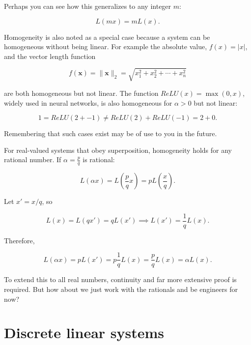\documentclass[
  letterpaper,
]{book}
\begin{document}
Perhaps you can see how this generalizes to any integer \(m\):

\[
L(m x) = m L(x).
\]

Homogeneity is also noted as a special case because a system can be
homogeneous without being linear. For example the absolute value,
\(f(x) = |x|\), and the vector length function

\[
f(\mathbf{x}) = \|\mathbf{x}\|_2 = \sqrt{x_1^2 + x_2^2 + \cdots + x_n^2}
\]

are both homogeneous but not linear. The function
\(ReLU(x) = \max(0, x)\), widely used in neural networks, is also
homogeneous for \(\alpha > 0\) but not linear:

\[
1 = ReLU(2 + -1) \neq ReLU(2) + ReLU(-1) = 2 + 0.
\]

Remembering that such cases exist may be of use to you in the future.

\begin{tcolorbox}[enhanced jigsaw, colframe=quarto-callout-note-color-frame, titlerule=0mm, rightrule=.15mm, opacitybacktitle=0.6, colback=white, leftrule=.75mm, coltitle=black, title=\textcolor{quarto-callout-note-color}{\faInfo}\hspace{0.5em}{Extension to Rational Numbers}, bottomrule=.15mm, colbacktitle=quarto-callout-note-color!10!white, breakable, left=2mm, bottomtitle=1mm, toptitle=1mm, opacityback=0, arc=.35mm, toprule=.15mm]

For real-valued systems that obey superposition, homogeneity holds for
any rational number. If \(\alpha = \frac{p}{q}\) is rational:

\[
L(\alpha x) = L\left(\frac{p}{q}x\right) = p L\left(\frac{x}{q}\right).
\]

Let \(x' = x/q\), so

\[
L(x) = L(q x') = q L(x') \implies L(x') = \frac{1}{q} L(x).
\]

Therefore,

\[
L(\alpha x) = p L(x') = p \frac{1}{q} L(x) = \frac{p}{q} L(x) = \alpha L(x).
\]

To extend this to all real numbers, continuity and far more extensive
proof is required. But how about we just work with the rationals and be
engineers for now?

\end{tcolorbox}

\section{Discrete linear systems}\label{sec-ls-discrete}
\end{document}

